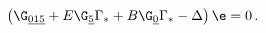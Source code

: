 \begin{equation}  \label{CY4kappa}
\left(\G_{\underline{015}}+E \G_{\underline{5}}\Gamma
_*+B\G_{\underline{0}}\Gamma _* - \Delta \right)\e=0 \,.
\end{equation}

